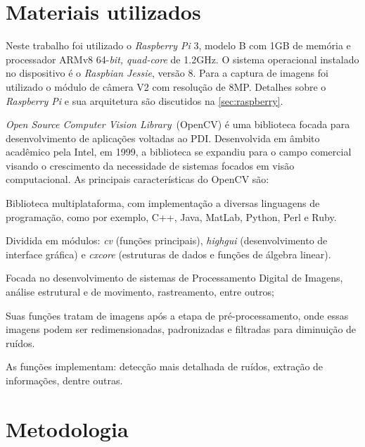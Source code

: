 \documentclass[12pt,oneside,a4paper,chapter=TITLE,section=TITLE,sumario=tradicional]{abntex2}
\begin{document}
\section{Materiais utilizados}

Neste trabalho foi utilizado o \textit{Raspberry Pi} 3, modelo B com 1GB de memória e processador ARMv8 64-\textit{bit, quad-core} de 1.2GHz. O sistema operacional instalado no dispositivo é o \textit{Raspbian Jessie}, versão 8. Para a captura de imagens foi utilizado o módulo de câmera V2 com resolução de 8MP. Detalhes sobre o \textit{Raspberry Pi} e sua arquitetura são discutidos na \autoref{sec:raspberry}.


\textit{Open Source Computer Vision Library}~(OpenCV) é uma biblioteca focada para desenvolvimento de aplicações voltadas ao PDI. Desenvolvida em âmbito acadêmico pela Intel, em 1999, a biblioteca se expandiu para o campo comercial visando o crescimento da necessidade de sistemas focados em visão computacional. As principais características do OpenCV são:

\begin{lista}
	    \item Biblioteca multiplataforma, com implementação a diversas linguagens de programação, como por exemplo, C++, Java, MatLab, Python, Perl e Ruby.
	    \item Dividida em módulos: \textit{cv} (funções principais), \textit{highgui} (desenvolvimento de interface gráfica) e \textit{cxcore} (estruturas de dados e funções de álgebra linear).
	    \item Focada no desenvolvimento de sistemas de Processamento Digital de Imagens, análise estrutural e de movimento, rastreamento, entre outros;
	    \item Suas funções tratam de imagens após a etapa de pré-processamento, onde essas imagens podem ser redimensionadas, padronizadas e filtradas para diminuição de ruídos.
	    \item As funções implementam: detecção mais detalhada de ruídos, extração de informações, dentre outras.
\end{lista}

\newpage

\section{Metodologia}
\end{document}
